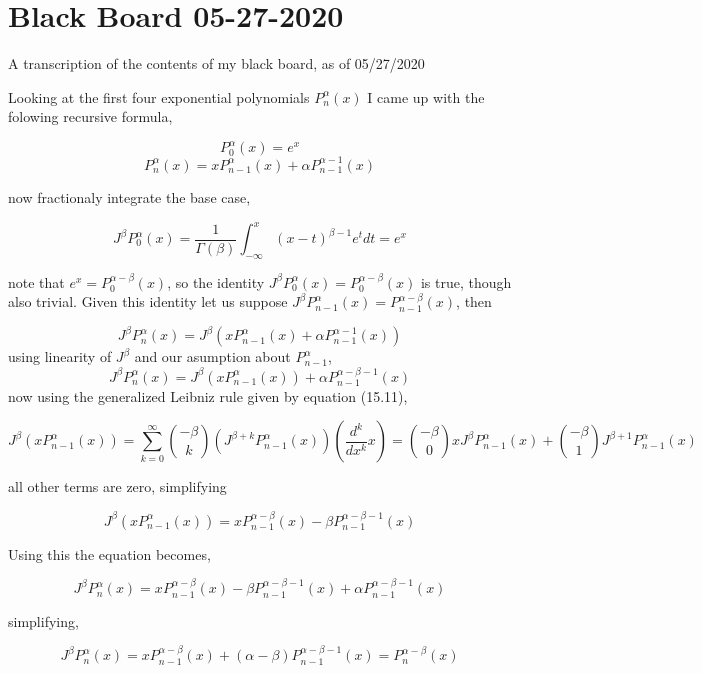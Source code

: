 \documentclass[%
 preprint,
 amsmath, amssymb, aps, pra, 10pt
]{revtex4-2}
\begin{document}
\section{Black Board 05-27-2020}

A transcription of the contents of my black board, as of 05/27/2020

Looking at the first four exponential polynomials $P_n^\alpha(x)$ I came up with the folowing recursive formula,

\[
P_{0}^{\alpha}(x) = e^x
\]
\begin{equation}
P_n^\alpha(x) = xP_{n-1}^\alpha(x) + \alpha P_{n-1}^{\alpha - 1}(x)
\label{polynomial_exponential_recursive}
\end{equation}

now fractionaly integrate the base case,

\[J^\beta P_0^\alpha(x) = \frac{1}{\Gamma(\beta)}\int_{-\infty}^x \left(x - t\right)^{\beta - 1}e^{t}dt = e^x\]

note that $e^x = P_0^{\alpha - \beta}(x)$, so the identity $J^\beta P_0^\alpha(x) = P_0^{\alpha - \beta}(x)$ is true, though also trivial. Given this identity let us suppose $J^\beta P_{n-1}^\alpha(x) = P_{n - 1}^{\alpha - \beta}(x)$, then

\[J^\beta P_n^\alpha(x) = J^\beta \left(xP_{n - 1}^\alpha(x) + \alpha P_{n - 1}^{\alpha - 1}(x)\right)\]
using linearity of $J^\beta$ and our asumption about $P_{n - 1}^\alpha$,
\[J^\beta P_n^\alpha(x) = J^\beta \left(xP_{n - 1}^\alpha(x)\right) + \alpha P_{n - 1}^{\alpha - \beta - 1}(x)\]
now using the generalized Leibniz rule given by \cite{Leibniz} equation (15.11),

\[
J^\beta \left(xP_{n - 1}^\alpha(x)\right) = \sum_{k=0}^{\infty} \binom{-\beta}{k}\left(J^{\beta + k}P_{n - 1}^\alpha(x)\right)\left(\frac{d^k}{dx^k}x\right) = \binom{-\beta}{0}xJ^\beta P_{n - 1}^\alpha(x) + \binom{-\beta}{1}J^{\beta + 1}P_{n - 1}^\alpha(x)
\]

all other terms are zero, simplifying

\[
J^\beta \left(xP_{n - 1}^\alpha(x)\right) = xP_{n - 1}^{\alpha - \beta}(x) - \beta P_{n - 1}^{\alpha - \beta - 1}(x)
\]

Using this the equation becomes,

\[
J^\beta P_n^\alpha(x) = xP_{n - 1}^{\alpha - \beta}(x) - \beta P_{n - 1}^{\alpha - \beta - 1}(x) + \alpha P_{n - 1}^{\alpha - \beta - 1}(x)
\]

simplifying,

\[
J^\beta P_n^\alpha(x) = xP_{n - 1}^{\alpha - \beta}(x) + \left(\alpha - \beta\right) P_{n - 1}^{\alpha - \beta - 1}(x) = P_n^{\alpha - \beta}(x)
\]
\end{document}
